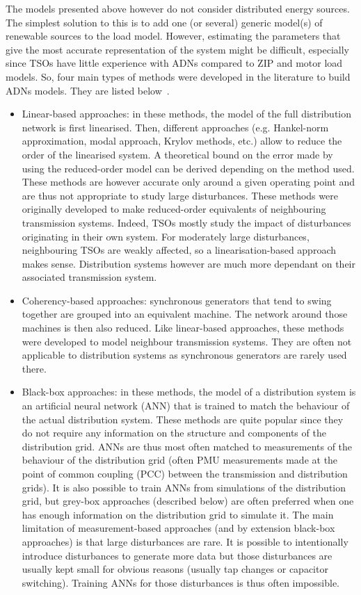 The models presented above however do not consider distributed energy sources. The simplest solution to this is to add one (or several) generic model(s) of renewable sources to the load model. However, estimating the parameters that give the most accurate representation of the system might be difficult, especially since TSOs have little experience with ADNs compared to ZIP and motor load models. So, four main types of methods were developed in the literature to build ADNs models. They are listed below~\cite{ADNreview2013}.

\begin{itemize}
    \item Linear-based approaches: in these methods, the model of the full distribution network is first linearised. Then, different approaches (e.g. Hankel-norm approximation, modal approach, Krylov methods, etc.) allow to reduce the order of the linearised system. A theoretical bound on the error made by using the reduced-order model can be derived depending on the method used. These methods are however accurate only around a given operating point and are thus not appropriate to study large disturbances. These methods were originally developed to make reduced-order equivalents of neighbouring transmission systems. Indeed, TSOs mostly study the impact of disturbances originating in their own system. For moderately large disturbances, neighbouring TSOs are weakly affected, so a linearisation-based approach makes sense. Distribution systems however are much more dependant on their associated transmission system.
    \item Coherency-based approaches: synchronous generators that tend to swing together are grouped into an equivalent machine. The network around those machines is then also reduced. Like linear-based approaches, these methods were developed to model neighbour transmission systems. They are often not applicable to distribution systems as synchronous generators are rarely used there.
    \item Black-box approaches: in these methods, the model of a distribution system is an artificial neural network (ANN) that is trained to match the behaviour of the actual distribution system. These methods are quite popular since they do not require any information on the structure and components of the distribution grid. ANNs are thus most often matched to measurements of the behaviour of the distribution grid (often PMU measurements made at the point of common coupling (PCC) between the transmission and distribution grids). It is also possible to train ANNs from simulations of the distribution grid, but grey-box approaches (described below) are often preferred when one has enough information on the distribution grid to simulate it. The main limitation of measurement-based approaches (and by extension black-box approaches) is that large disturbances are rare. It is possible to intentionally introduce disturbances to generate more data but those disturbances are usually kept small for obvious reasons (usually tap changes or capacitor switching). Training ANNs for those disturbances is thus often impossible.

\end{itemize}

